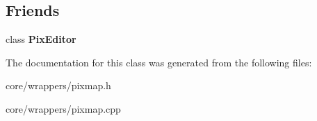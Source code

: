 \subsection*{Friends}
\begin{DoxyCompactItemize}
\item 
\hypertarget{class_tempest_1_1_pixmap_ae9157eb4124a780977e1c8b2d9c6a40e}{class {\bfseries Pix\+Editor}}\label{class_tempest_1_1_pixmap_ae9157eb4124a780977e1c8b2d9c6a40e}

\end{DoxyCompactItemize}


The documentation for this class was generated from the following files\+:\begin{DoxyCompactItemize}
\item 
core/wrappers/pixmap.\+h\item 
core/wrappers/pixmap.\+cpp\end{DoxyCompactItemize}
